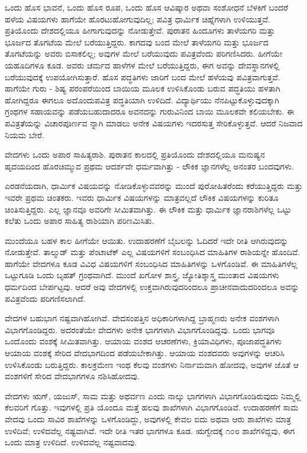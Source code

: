 ಒಂದು ಹೊಸ ಭಾವನೆ, ಒಂದು ಹೊಸ ರೂಪ, ಒಂದು ಹೊಸ ಆವಿಷ್ಕಾರ ಅಥವಾ ಸಂಶೋಧನೆ ಬೆಳಕಿಗೆ ಬಂದರೆ ಹಳೆಯ ವಿಷಯಗಳು ಹಾಗೆಯೇ ಹೊರಟುಹೋಗುವುದಿಲ್ಲ; ಪವಿತ್ರ ಧಾರ್ಮಿಕ ಚಿಹ್ನೆಗಳಾಗಿ ಉಳಿಯುತ್ತವೆ. ಪ್ರತಿಯೊಂದು ದೇಶದಲ್ಲಿಯೂ ಹೀಗಾಗುವುದನ್ನು ನೋಡುತ್ತೇವೆ. ಪುರಾತನ ಹಿಂದೂಗಳು ತಾಳೆಯಗರಿ ಮತ್ತು ಭೂರ್ಜದ ತೊಗಟೆಯ ಮೇಲೆ ಬರೆಯುತ್ತಿದ್ದರು. ಕಾಗದವು ಬಂದ ಮೇಲೆ ತಾಳೆಯಗರಿ ಮತ್ತು ಭೂರ್ಜದ ತೊಗಟೆಯನ್ನು ಅವರು ಬಿಸಾಕಲಿಲ್ಲ; ಅವುಗಳ ಮೇಲೆ ಬರೆಯುವುದು ಪವಿತ್ರವೆಂದು ಪರಿಗಣಿಸಿದರು. ಹೀಗೆಯೇ ಯಹೂದಿಗಳೂ ಕೂಡ. ಅವರು ಚರ್ಮದ ಹಾಳೆಗಳ ಮೇಲೆ ಬರೆಯುತ್ತಿದ್ದರು, ಈಗ ಅವನ್ನು ದೇವಸ್ಥಾನಗಳಲ್ಲಿ ಬರೆಯುವುದಕ್ಕೆ ಉಪಯೋಗಿಸುತ್ತಾರೆ. ಹೊಸ ಪದ್ಧತಿಗಳು ಜಾರಿಗೆ ಬಂದ ಮೇಲೆ ಹಳೆಯವು ಪವಿತ್ರವಾಗುತ್ತವೆ. ಹಾಗೆಯೇ ಗುರು - ಶಿಷ್ಯ ಪರಂಪರೆಯಿಂದ ಬಾಯಿಯ ಮೂಲಕ ಉಳಿಸಿಕೊಂಡು ಬರುವ ಪದ್ಧತಿಯು ಹಳತಾಗಿ ಹೋಗಿದ್ದರೂ ಈಗಲೂ ಅದೊಂದುಪವಿತ್ರ ಪದ್ಧತಿಯಾಗಿ ಉಳಿದಿದೆ. ವಿದ್ಯಾರ್ಥಿಯು ನೆನಪಿಟ್ಟುಕೊಳ್ಳುವುದಕ್ಕಾಗಿ ಗ್ರಂಥಗಳ ಸಹಾಯವನ್ನು ಪಡೆಯಬಹುದಾದರೂ ಅವನದನ್ನು ಗುರುವಿನಿಂದ ಬಾಯಿ ಮೂಲಕವೇ ಕಲಿಯಬೇಕು. ಈ ಪವಿತ್ರತೆಯನ್ನು ವಿಚಾರಪೂರ್ಣವ ನ್ನಾಗಿ ಮಾಡಲು ಅನೇಕ ವಿಷಯಗಳು ಇದರಸುತ್ತ ಸೇರಿಕೊಳ್ಳುತ್ತವೆ. ಆದರೆ ನಿಜವಾದ ನಿಯಮ ಬೇರೆ.

ವೇದಗಳು ಒಂದು ಅಪಾರ ಸಾಹಿತ್ಯರಾಶಿ. ಪುರಾತನ ಕಾಲದಲ್ಲಿ ಪ್ರತಿಯೊಂದು ದೇಶದಲ್ಲಿಯೂ ಮನುಷ್ಯನ ಹೃದಯದಿಂದ ಹೊರಚಿಮ್ಮುವ ಪ್ರಥಮ ಆದರ್ಶವೇ ಧರ್ಮವಾಗಿತ್ತು - ಲೌಕಿಕ ಜ್ಞಾನಗಳೆಲ್ಲ ಅನಂತರ ಬಂದವುಗಳು.

ಎರಡನೆಯದಾಗಿ, ಧಾರ್ಮಿಕ ವಿಷಯವನ್ನು ನೋಡಿಕೊಳ್ಳುವವರನ್ನು ಮುಂದೆ ಪುರೋಹಿತರೆಂದು ಕರೆಯುತ್ತಿದ್ದರು ಮತ್ತು ಇವರೇ ಪ್ರಥಮ ಚಿಂತಕರು. ಇವರು ಧಾರ್ಮಿಕ ವಿಷಯಗಳನ್ನು ಮಾತ್ರವಲ್ಲದೆ ಲೌಕಿಕ ವಿಷಯಗಳನ್ನು ಕುರಿತೂ ಚಿಂತಿಸುತ್ತಿದ್ದರು. ಎಲ್ಲ ಜ್ಞಾನವೂ ಅವರಿಗೇ ಸೀಮಿತವಾಗಿತ್ತು. ಈ ಲೌಕಿಕ ಮತ್ತು ಧಾರ್ಮಿಕ ಜ್ಞಾನರಾಶಿಗಳೆಲ್ಲ ಒಟ್ಟು ಕಲೆತು ಒಂದು ಅಪಾರ ಸಾಹಿತ್ಯ ರಾಶಿಯಾಗಿ ಪರಿಣಮಿಸಿತು.

ಮುಂದೆಯೂ ಬಹಳ ಕಾಲ ಹೀಗೆಯೇ ಆಯಿತು. ಉದಾಹರಣೆಗೆ ಬೈಬಲನ್ನು ಓದಿದರೆ ಇದೇ ರೀತಿ ಆಗಿರುವುದನ್ನು ನೋಡುತ್ತೇವೆ. ತಾಲ್ಮುಡ್ ಮತ್ತು ಪೆಂಟಾಟೆಕ್ ಎಲ್ಲ ವಿಷಯಗಳಿಗೆ ಸಂಬಂಧಿಸಿದ ಮಾಹಿತಿಗಳ ರಾಶಿಯನ್ನೇ ಹೊಂದಿವೆ. ಹಾಗೆಯೇ ವೇದಗಳೂ ಕೂಡ ವಿವಿಧ ವಿಷಯಗಳಿಗೆ ಸಂಬಂಧಿಸಿದ ಮಾಹಿತಿಗಳನ್ನು ಒಳಗೊಂಡಿವೆ. ಈ ಮಾಹಿತಿಗಳೆಲ್ಲ ಒಟ್ಟುಗೂಡಿ ಒಂದು ಬೃಹತ್ ಗ್ರಂಥವಾಗಿದೆ. ಮುಂದೆ ಖಗೋಳ ಶಾಸ್ತ್ರ, ಜ್ಯೋತಿಶ್ಶಾಸ್ತ್ರ ಮುಂತಾದ ವಿಷಯಗಳು ಧರ್ಮದಿಂದ ಬೇರ್ಪಟ್ಟವು. ಆದರೆ ಅವು ವೇದಗಳಲ್ಲಿ ಉಕ್ತವಾಗಿರುವುದರಿಂದಲೂ ಪ್ರಾಚೀನವಾದುದರಿಂದಲೂ ಅವನ್ನು ಪವಿತ್ರವೆಂದು ಪರಿಗಣಿಸಲಾಗಿದೆ.

ವೇದಗಳ ಬಹುಭಾಗ ನಷ್ಟವಾಗಿಹೋಗಿವೆ. ವೇದಸಂಪತ್ತಿನ ಅಧಿಕಾರಿಗಳಾಗಿದ್ದ ಬ್ರಾಹ್ಮಣರು ಅನೇಕ ವಂಶಗಳಾಗಿ ವಿಭಾಗಗೊಂಡಿದ್ದರು. ಅದರಂತೆಯೇ ವೇದಗಳು ಅನೇಕ ಭಾಗಗಳಾಗಿ ವಿಭಾಗಗೊಂಡಿದ್ದವು. ಒಂದು ಭಾಗವೂ ಒಂದೊಂದು ವಂಶಕ್ಕೆ ಸೀಮಿತವಾಗಿತ್ತು. ಆಯಾಯ ವಂಶದ ಆಚರಣೆಗಳು, ಕ್ರಿಯಾವಿಧಿಗಳು, ಪೂಜಾಪದ್ಧತಿಗಳು ಆಯಾಯ ವಂಶಕ್ಕೆ ಸೇರಿದ ವೇದಭಾಗದಿಂದ ಪಡೆಯಬೇಕಾಗಿತ್ತು. ಆಯಾಯ ವಂಶದವರು ಅವುಗಳನ್ನು ಆಚರಿಸಿ ಉಳಿಸಿಕೊಂಡು ಬರುತ್ತಿದ್ದರು. ಕಾಲಕ್ರಮೇಣ ಇಂಥ ಕೆಲವು ವಂಶಗಳು ನಿರ್ನಾಮವಾಗಿ ಹೋದವು, ಅವುಗಳ ಜೊತೆ ಆ ವಂಶಗಳಿಗೆ ಸೇರಿದ ವೇದಭಾಗಗಳೂ ನಶಿಸಿಹೋದವು.

ವೇದಗಳು ಋಗ್, ಯಜುಸ್, ಸಾಮ ಮತ್ತು ಅಥರ್ವಣ ಎಂದು ನಾಲ್ಕು ಭಾಗಗಳಾಗಿ ವಿಭಾಗಗೊಂಡಿರುವುದು ನಿಮ್ಮಲ್ಲಿ ಕೆಲವರಿಗೆ ಗೊತ್ತು. ಇವುಗಳಲ್ಲಿ ಪ್ರತಿ ಯೊಂದೂ ಮತ್ತೆ ಹಲವು ಶಾಖೆಗಳಾಗಿ ವಿಭಾಗಗೊಂಡಿವೆ. ಉದಾಹರಣೆಗೆ ಸಾಮ ವೇದವು ಒಂದು ಸಾವಿರ ಶಾಖೆಗಳನ್ನು ಒಳಗೊಂಡಿದ್ದು, ಅವುಗಳಲ್ಲಿ ಕೇವಲ ಐದು ಅಥವಾ ಆರು ಶಾಖೆಗಳು ಮಾತ್ರ ಉಳಿದಿವೆ; ಉಳಿದವೆಲ್ಲ ನಷ್ಟವಾಗಿವೆ. ಇದೇ ರೀತಿ ಇತರ ಭಾಗಗಳೂ ಕೂಡ. ಋಗ್ವೇದಕ್ಕೆ ೧೦೮ ಶಾಖೆಗಳಿದ್ದವು, ಈಗ ಒಂದು ಮಾತ್ರ ಉಳಿದಿದೆ. ಉಳಿದವೆಲ್ಲ ನಷ್ಟವಾದವು.

